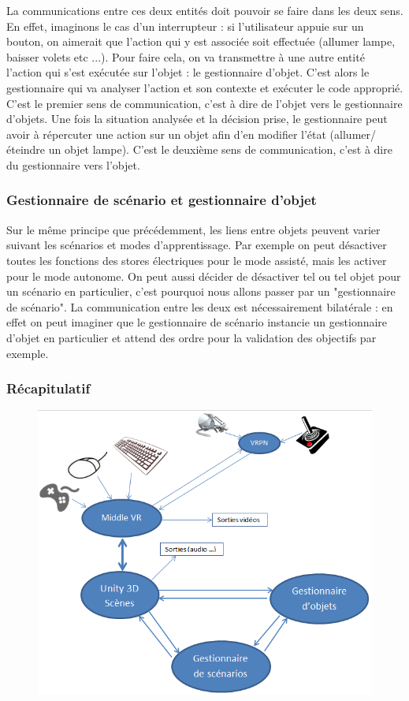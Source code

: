 La communications entre ces deux entités doit pouvoir se faire dans les deux sens. 
En effet, imaginons le cas d'un interrupteur : si l'utilisateur appuie sur un bouton, on aimerait que l'action qui y est associée soit effectuée (allumer lampe, baisser volets etc ...). 
Pour faire cela, on va transmettre à une autre entité l'action qui s'est exécutée sur l'objet : le gestionnaire d'objet. 
C'est alors le gestionnaire qui va analyser l'action et son contexte et exécuter le code approprié. C'est le premier sens de communication, c'est à dire de l'objet vers le gestionnaire d'objets.
Une fois la situation analysée et la décision prise, le gestionnaire peut avoir à répercuter une action sur un objet afin d'en modifier l'état (allumer/éteindre un objet lampe). 
C'est le deuxième sens de communication, c'est à dire du gestionnaire vers l'objet.

\subsubsection{Gestionnaire de scénario et gestionnaire d'objet}

Sur le même principe que précédemment, les liens entre objets peuvent varier suivant les scénarios et modes d'apprentissage. 
Par exemple on peut désactiver toutes les fonctions des stores électriques pour le mode assisté, mais les activer pour le mode autonome. 
On peut aussi décider de désactiver tel ou tel objet pour un scénario en particulier, c'est pourquoi nous allons passer par un "gestionnaire de scénario". 
La communication entre les deux est nécessairement bilatérale : en effet on peut imaginer que le gestionnaire de scénario instancie un gestionnaire d'objet en particulier et attend des ordre pour la validation des objectifs par exemple.

\subsubsection{Récapitulatif}
\begin{figure}
	\centering
		\includegraphics[width=\textwidth]{2-Specifications/img/recap.png}
	\label{fig:unityvr}
\end{figure}


